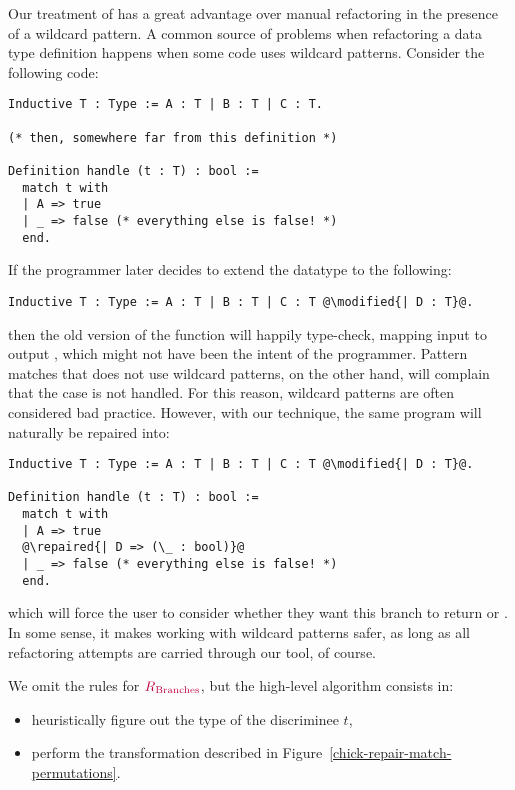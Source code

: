 Our treatment of  has a great advantage over manual refactoring
in the presence of a wildcard pattern.  A common source of problems when
refactoring a data type definition happens when some code uses wildcard
patterns.  Consider the following code:

\begin{verbatim}
Inductive T : Type := A : T | B : T | C : T.

(* then, somewhere far from this definition *)

Definition handle (t : T) : bool :=
  match t with
  | A => true
  | _ => false (* everything else is false! *)
  end.
\end{verbatim}

\noindent%
%
If the programmer later decides to extend the datatype to the following:

\begin{verbatim}
Inductive T : Type := A : T | B : T | C : T @\modified{| D : T}@.
\end{verbatim}

\noindent%
%
then the old version of the  function will happily type-check,
mapping input  to output , which might not have
been the intent of the programmer.  Pattern matches that does not use wildcard
patterns, on the other hand, will complain that the  case is not
handled.  For this reason, wildcard patterns are often considered bad practice.
However, with our technique, the same program will naturally be repaired into:

\begin{verbatim}
Inductive T : Type := A : T | B : T | C : T @\modified{| D : T}@.

Definition handle (t : T) : bool :=
  match t with
  | A => true
  @\repaired{| D => (\_ : bool)}@
  | _ => false (* everything else is false! *)
  end.
\end{verbatim}

\noindent%
%
which will force the user to consider whether they want this branch to return
 or .  In some sense, it makes working with
wildcard patterns safer, as long as all refactoring attempts are carried through
our tool, of course.

We omit the rules for $\textcolor{purple}{R_{\text{Branches}}}{}$, but the high-level algorithm
consists in:

\begin{itemize}

  \item heuristically figure out the type of the discriminee $t$,

  \item perform the transformation described in
Figure~\ref{chick-repair-match-permutations}.

\end{itemize}

